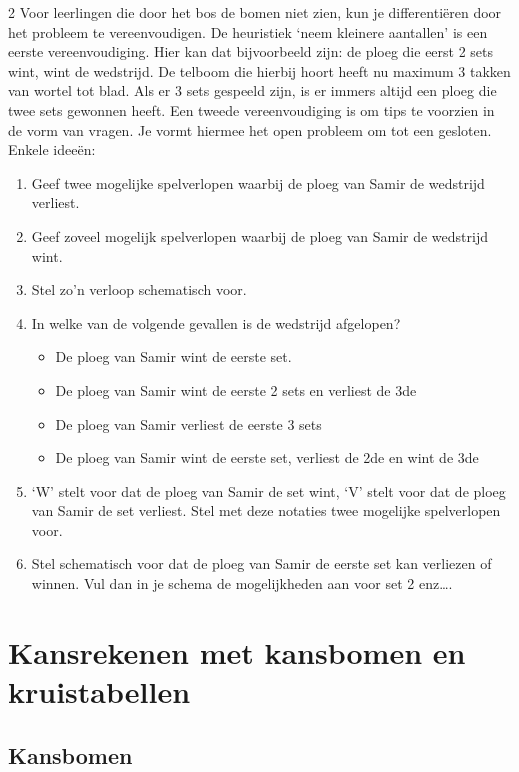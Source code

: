 \begin{multicols}{2}
Voor leerlingen die door het bos de bomen niet zien, kun je differentiëren door het probleem te vereenvoudigen. De heuristiek ‘neem kleinere aantallen’ is een eerste vereenvoudiging. Hier kan dat bijvoorbeeld zijn: de ploeg die eerst 2 sets wint, wint de wedstrijd.  De telboom die hierbij hoort heeft nu maximum 3 takken van wortel tot blad. Als er 3 sets gespeeld zijn, is er immers altijd een ploeg die twee sets gewonnen heeft. Een tweede vereenvoudiging is om tips te voorzien in de vorm van vragen. Je vormt hiermee het open probleem om tot een gesloten. Enkele ideeën:
\begin{enumerate}
    \item Geef twee mogelijke spelverlopen waarbij de ploeg van Samir de wedstrijd verliest. 
\item Geef zoveel mogelijk spelverlopen waarbij de ploeg van Samir de wedstrijd wint. 
\item Stel zo’n verloop schematisch voor.
\item In welke van de volgende gevallen is de wedstrijd afgelopen?
\begin{itemize}
    \item De ploeg van Samir wint de eerste set.
    \item De ploeg van Samir wint de eerste 2 sets en verliest de 3de
\item De ploeg van Samir verliest de eerste 3 sets
\item De ploeg van Samir wint de eerste set, verliest de 2de en wint de 3de
\end{itemize}
\item ‘W’ stelt voor dat de ploeg van Samir de set wint, ‘V’ stelt voor dat de ploeg van Samir de set verliest. Stel met deze notaties twee mogelijke spelverlopen voor.
\item Stel schematisch voor dat de ploeg van Samir de eerste set kan verliezen of winnen. Vul dan in je schema de mogelijkheden aan voor set 2 enz….
\end{enumerate}

\section{Kansrekenen met kansbomen en kruistabellen}

\subsection{Kansbomen}

\end{multicols}
